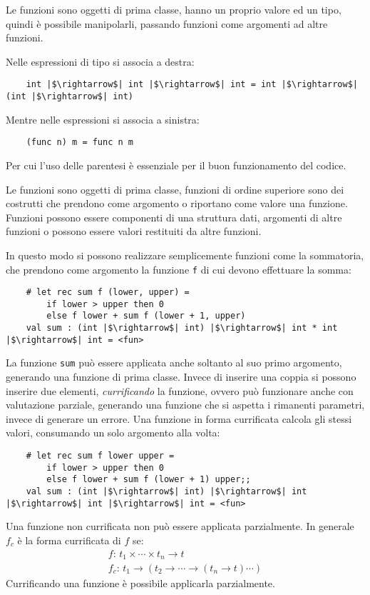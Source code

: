 \documentclass{article}
\numberwithin{equation}{subsection}
\begin{document}
Le funzioni sono oggetti di prima classe, hanno un proprio valore ed un tipo, quindi è possibile manipolarli, passando funzioni come argomenti ad altre funzioni. 

Nelle espressioni di tipo si associa a destra:
\begin{verbatim}
    int |$\rightarrow$| int |$\rightarrow$| int = int |$\rightarrow$| (int |$\rightarrow$| int)
\end{verbatim}
Mentre nelle espressioni si associa a sinistra:
\begin{verbatim}
    (func n) m = func n m
\end{verbatim}
Per cui l'uso delle parentesi è essenziale per il buon funzionamento del codice. 

Le funzioni sono oggetti di prima classe, funzioni di ordine superiore sono dei costrutti che prendono come argomento o riportano come valore una funzione. 
Funzioni possono essere componenti di una struttura dati, argomenti di altre funzioni o possono essere valori restituiti da altre funzioni. 


In questo modo si possono realizzare semplicemente funzioni come la sommatoria, che prendono come argomento la funzione \verb|f| di cui devono effettuare la somma:
\begin{verbatim}
    # let rec sum f (lower, upper) =
        if lower > upper then 0
        else f lower + sum f (lower + 1, upper)
    val sum : (int |$\rightarrow$| int) |$\rightarrow$| int * int |$\rightarrow$| int = <fun>
\end{verbatim}

La funzione \verb|sum| può essere applicata anche soltanto al suo primo argomento, generando una funzione di prima classe. Invece di inserire una coppia si possono inserire due elementi, \textit{currificando} la funzione, ovvero può funzionare anche con valutazione parziale, generando una funzione che si aspetta i rimanenti parametri, invece di generare un errore. Una funzione in forma currificata calcola gli stessi valori, consumando un solo argomento alla volta:
\begin{verbatim}
    # let rec sum f lower upper =
        if lower > upper then 0
        else f lower + sum f (lower + 1) upper;;
    val sum : (int |$\rightarrow$| int) |$\rightarrow$| int |$\rightarrow$| int |$\rightarrow$| int = <fun>
\end{verbatim}

Una funzione non currificata non può essere applicata parzialmente. 
In generale $f_c$ è la forma currificata di $f$ se:
\begin{gather*}
    f:\,t_1\times\cdots\times t_n\rightarrow t\\
    f_c:\,t_1\rightarrow(t_2\rightarrow\cdots\rightarrow(t_n\rightarrow t)\cdots)
\end{gather*}
Currificando una funzione è possibile applicarla parzialmente. 
\end{document}
